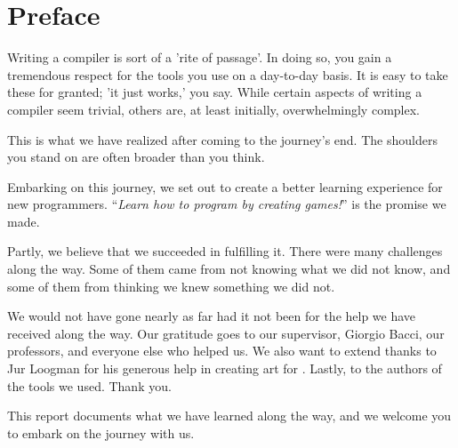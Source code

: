 \chapter*{Preface}
\thispagestyle{empty}

Writing a compiler is sort of a 'rite of passage'. In doing so, you gain a tremendous respect for the tools you use on a day-to-day basis. It is easy to take these for granted; 'it just works,' you say. While certain aspects of writing a compiler seem trivial, others are, at least initially, overwhelmingly complex.

This is what we have realized after coming to the journey's end. The shoulders you stand on are often broader than you think.

Embarking on this journey, we set out to create a better learning experience for new programmers. ``\textit{Learn how to program by creating games!}'' is the promise we made.

Partly, we believe that we succeeded in fulfilling it. There were many challenges along the way. Some of them came from not knowing what we did not know, and some of them from thinking we knew something we did not.

We would not have gone nearly as far had it not been for the help we have received along the way. Our gratitude goes to our supervisor, Giorgio Bacci, our professors, and everyone else who helped us. We also want to extend thanks to Jur Loogman for his generous help in creating art for \dazel{}. Lastly, to the authors of the tools we used. Thank you.

This report documents what we have learned along the way, and we welcome you to embark on the journey with us.